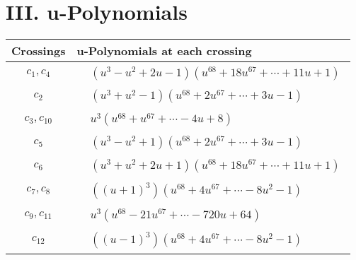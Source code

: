 \documentclass[1p]{elsarticle_modified}
\theoremstyle{definition}
\begin{document}
\newpage\renewcommand{\arraystretch}{1}
\centering \section*{ III. u-Polynomials}
\begin{tabular}{m{50pt}|m{274pt}}
Crossings & \hspace{64pt}u-Polynomials at each crossing \\
\hline $$\begin{aligned}c_{1},c_{4}\end{aligned}$$&$\begin{aligned}
&(u^3- u^2+2 u-1)(u^{68}+18 u^{67}+\cdots+11 u+1)
\end{aligned}$\\
\hline $$\begin{aligned}c_{2}\end{aligned}$$&$\begin{aligned}
&(u^3+u^2-1)(u^{68}+2 u^{67}+\cdots+3 u-1)
\end{aligned}$\\
\hline $$\begin{aligned}c_{3},c_{10}\end{aligned}$$&$\begin{aligned}
&u^3(u^{68}+u^{67}+\cdots-4 u+8)
\end{aligned}$\\
\hline $$\begin{aligned}c_{5}\end{aligned}$$&$\begin{aligned}
&(u^3- u^2+1)(u^{68}+2 u^{67}+\cdots+3 u-1)
\end{aligned}$\\
\hline $$\begin{aligned}c_{6}\end{aligned}$$&$\begin{aligned}
&(u^3+u^2+2 u+1)(u^{68}+18 u^{67}+\cdots+11 u+1)
\end{aligned}$\\
\hline $$\begin{aligned}c_{7},c_{8}\end{aligned}$$&$\begin{aligned}
&((u+1)^3)(u^{68}+4 u^{67}+\cdots-8 u^2-1)
\end{aligned}$\\
\hline $$\begin{aligned}c_{9},c_{11}\end{aligned}$$&$\begin{aligned}
&u^3(u^{68}-21 u^{67}+\cdots-720 u+64)
\end{aligned}$\\
\hline $$\begin{aligned}c_{12}\end{aligned}$$&$\begin{aligned}
&((u-1)^3)(u^{68}+4 u^{67}+\cdots-8 u^2-1)
\end{aligned}$\\
\hline
\end{tabular}\newpage\renewcommand{\arraystretch}{1}
\end{document}
